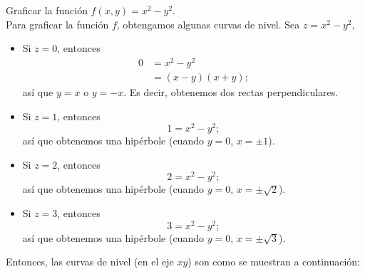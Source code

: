\begin{example}
    Graficar la función $f(x, y) = x^{2} - y^{2}$.\\
    \solucion Para graficar la función $f$, obtengamos algunas curvas de nivel. Sea $z = x^2 - y^2$,
    \begin{itemize}
        \item Si $z = 0$, entonces
        \begin{align*}
            0 & = x^2 - y^2 \\
            & = (x-y)(x+y);
        \end{align*}
        así que $y = x$ o $y = -x$. Es decir, obtenemos dos rectas perpendiculares.
        \item Si $z = 1$, entonces
        $$1 = x^2 - y^2;$$
        así que obtenemos una hipérbole (cuando $y = 0$, $x = \pm 1$).
        \item Si $z = 2$, entonces
        $$2 = x^2 - y^2;$$
        así que obtenemos una hipérbole (cuando $y = 0$, $x = \pm \sqrt{2}$).
        \item Si $z = 3$, entonces
        $$3 = x^2 - y^2;$$
        así que obtenemos una hipérbole (cuando $y = 0$, $x = \pm \sqrt{3}$).
    \end{itemize}
    Entonces, las curvas de nivel (en el eje $xy$) son como se muestran a continuación:
    \begin{figure}[h!]
        \centering
         \hfill
         \\
\end{figure}
\end{example}
